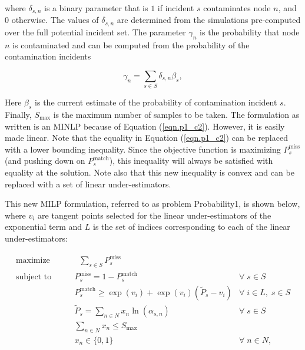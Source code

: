 where $\delta_{s,n}$ is a binary parameter that is $1$ if incident $s$ contaminates node $n$, and $0$ otherwise. The values of $\delta_{s,n}$ are determined from the simulations pre-computed over the full potential incident set. The parameter $\gamma_n$ is the probability that node $n$ is contaminated and can be computed from the probability of the contamination incidents

\begin{equation}
\gamma_n = \sum_{s \in S} \delta_{s,n}\beta_s,
\label{nodeprob}
\end{equation}

Here $\beta_s$ is the current estimate of the probability of contamination incident $s$. Finally, $S_{\textrm{max}}$ is the maximum number of samples to be taken. The formulation as written is an MINLP because of Equation (\ref{eqn.p1_c2}). However, it is easily made linear. Note that the equality in Equation (\ref{eqn.p1_c2}) can be replaced with a lower bounding inequality. Since the objective function is maximizing $P_{s}^{\textrm{miss}}$ (and pushing down on $P_{s}^{\textrm{match}}$), this inequality will always be satisfied with equality at the solution. Note also that this new inequality is convex and can be replaced with a set of linear under-estimators.

This new MILP formulation, referred to as problem Probability1, is shown below, where $v_{i}$ are tangent
points selected for the linear under-estimators of the exponential term and $L$ is the set of indices corresponding to each of the linear under-estimators:

\begin{align}
\textrm{maximize}\qquad & \;\; \sum_{s\in S}P_{s}^{\textrm{miss}} &  \label{eqn.p1_obj1}\\
\textrm{subject to}\qquad &P_{s}^{\textrm{miss}} = 1-P_{s}^{\textrm{match}} & \forall \; s \in S \label{eqn.p1_c11}\\
&P_{s}^{\textrm{match}} \geq \exp(v_i) + \exp(v_i) \left( \tilde{P}_{s} - v_i \right) & \forall \; i \in L, \; s \in S \label{eqn.p1_c21} \\
&\tilde{P}_{s} =  \sum_{n\in N} x_n \ln(\alpha_{s,n}) & \forall \; s \in S \label{eqn.p1_c31}\\
&\sum_{n\in N} x_n \le S_{\textrm{max}}  & \label{eqn.p1_c41}\\
&x_{n} \in \{0,1\} & \forall \; n \in N ,\label{eqn.p1_c51}
\end{align}

